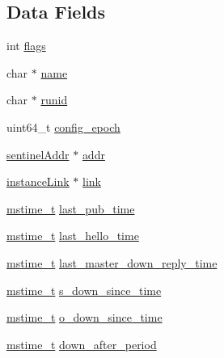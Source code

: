 \subsection*{Data Fields}
\begin{DoxyCompactItemize}
\item 
int \hyperlink{structsentinel_redis_instance_ac8bf36fe0577cba66bccda3a6f7e80a4}{flags}
\item 
char $\ast$ \hyperlink{structsentinel_redis_instance_a5ac083a645d964373f022d03df4849c8}{name}
\item 
char $\ast$ \hyperlink{structsentinel_redis_instance_a79643793f84ca3b8331db57a3cf40ba6}{runid}
\item 
uint64\+\_\+t \hyperlink{structsentinel_redis_instance_ad6b217bc7a238bcea7aaa728f7b4a61d}{config\+\_\+epoch}
\item 
\hyperlink{structsentinel_addr}{sentinel\+Addr} $\ast$ \hyperlink{structsentinel_redis_instance_adccd3ce5b53a2f111dcad59bed5050c4}{addr}
\item 
\hyperlink{structinstance_link}{instance\+Link} $\ast$ \hyperlink{structsentinel_redis_instance_a415450a5022285cd6515a619e4aa7e42}{link}
\item 
\hyperlink{redismodule_8h_a652ae61e2475bc8957454534544968fc}{mstime\+\_\+t} \hyperlink{structsentinel_redis_instance_a863a73e46df5a7769d5d74b6ac716d86}{last\+\_\+pub\+\_\+time}
\item 
\hyperlink{redismodule_8h_a652ae61e2475bc8957454534544968fc}{mstime\+\_\+t} \hyperlink{structsentinel_redis_instance_a491dc351be01e08d39817cbf1f16647b}{last\+\_\+hello\+\_\+time}
\item 
\hyperlink{redismodule_8h_a652ae61e2475bc8957454534544968fc}{mstime\+\_\+t} \hyperlink{structsentinel_redis_instance_aae1e2e118270b61bde10cc110b234d48}{last\+\_\+master\+\_\+down\+\_\+reply\+\_\+time}
\item 
\hyperlink{redismodule_8h_a652ae61e2475bc8957454534544968fc}{mstime\+\_\+t} \hyperlink{structsentinel_redis_instance_a8c02532f07a924709285031aa84c2ddf}{s\+\_\+down\+\_\+since\+\_\+time}
\item 
\hyperlink{redismodule_8h_a652ae61e2475bc8957454534544968fc}{mstime\+\_\+t} \hyperlink{structsentinel_redis_instance_aa3248ffed349f485ec4403a8c478703c}{o\+\_\+down\+\_\+since\+\_\+time}
\item 
\hyperlink{redismodule_8h_a652ae61e2475bc8957454534544968fc}{mstime\+\_\+t} \hyperlink{structsentinel_redis_instance_af7c1577098042289c7eb0fa5ab3e0cda}{down\+\_\+after\+\_\+period}
\item 

\end{DoxyCompactItemize}
